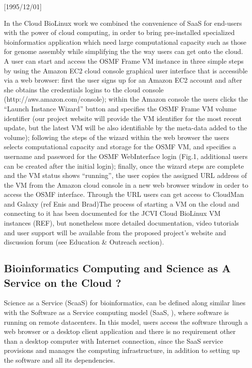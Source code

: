 \NeedsTeXFormat{LaTeX2e}[1995/12/01] \documentclass[10pt]{bmc_article}
\newenvironment{bmcformat}{\begin{raggedright}\baselineskip20pt\sloppy\setboolean{publ}{false}}{\end{raggedright}\baselineskip20pt\sloppy}
\begin{document}
\begin{bmcformat}
In the Cloud BioLinux work we combined the convenience of SaaS for end-users with the power of cloud computing, 
in order to bring pre-installed specialized bioinformatics application which need large computational capacity 
such as those for genome assembly while simplifying the the way users can get onto the cloud.
A user can start and access the OSMF Frame VM instance in three simple steps by using the Amazon EC2 cloud console 
graphical user interface that is accessible via a web browser: first the user signs up for an Amazon EC2 account and 
after she obtains the credentials logins to the cloud console (http://aws.amazon.com/console);  within the Amazon 
console the users clicks the “Launch Instance Wizard” button and specifies the OSMF Frame VM volume identifier 
(our project website will provide the VM identifier for the most recent update, but the latest VM will be also identifiable 
by the meta-data added to the volume); following the steps of the wizard within the web browser the users selects 
computational capacity and storage for the OSMF VM, and specifies a username and password for the OSMF 
WebInterface login (Fig.1, additional users can be created after the initial login); finally, once the wizard steps are 
complete and the VM status shows “running”, the user copies the assigned URL address of the VM from the Amazon 
cloud console in a new web browser window in order to access the OSMF interface. Through the URL users can get access
to CloudMan and Galaxy (ref Enis and Brad)The process of starting a VM on 
the cloud and connecting to it has been documented for the JCVI Cloud BioLinux VM instances (REF), but nonetheless 
more detailed documentation, video tutorials and user support will be available from the proposed project's website 
and discussion forum (see Education & Outreach section).

\subsection*{Bioinformatics Computing and Science as A Service on the Cloud ?}

Science as a Service (ScaaS) for bioinformatics, can be defined along similar lines with the Software as a Service  
computing model (SaaS, \cite{papazoglou2003}), where software is running on remote datacenters. In this model, 
users access the software through a web browser or a desktop client application and there is no requirement other 
than a desktop computer with Internet connection, since the SaaS service provisions and manages the computing 
infrastructure, in addition to setting up the software and all its dependencies. \pb


\end{bmcformat}
\end{document}

